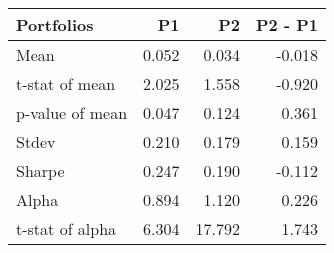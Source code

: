 \begin{tabular}{lrrr}
\toprule
Portfolios & P1 & P2 & P2 - P1 \\
\midrule
Mean & 0.052 & 0.034 & -0.018 \\
t-stat of mean & 2.025 & 1.558 & -0.920 \\
p-value of mean & 0.047 & 0.124 & 0.361 \\
Stdev & 0.210 & 0.179 & 0.159 \\
Sharpe & 0.247 & 0.190 & -0.112 \\
Alpha & 0.894 & 1.120 & 0.226 \\
t-stat of alpha & 6.304 & 17.792 & 1.743 \\
\bottomrule
\end{tabular}
